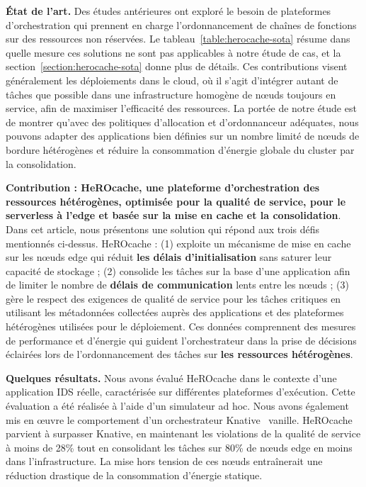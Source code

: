 \textbf{État de l'art.} Des études antérieures ont exploré le besoin de plateformes d'orchestration qui prennent en charge l'ordonnancement de chaînes de fonctions sur des ressources non réservées. Le tableau~\ref{table:herocache-sota} résume dans quelle mesure ces solutions ne sont pas applicables à notre étude de cas, et la section~\ref{section:herocache-sota} donne plus de détails. Ces contributions visent généralement les déploiements dans le cloud, où il s'agit d'intégrer autant de tâches que possible dans une infrastructure homogène de nœuds toujours en service, afin de maximiser l'efficacité des ressources. La portée de notre étude est de montrer qu'avec des politiques d'allocation et d'ordonnanceur adéquates, nous pouvons adapter des applications bien définies sur un nombre limité de nœuds de bordure hétérogènes et réduire la consommation d'énergie globale du cluster par la consolidation.

\textbf{Contribution : HeROcache, une plateforme d'orchestration des ressources hétérogènes, optimisée pour la qualité de service, pour le serverless à l'edge et basée sur la mise en cache et la consolidation}. Dans cet article, nous présentons une solution qui répond aux trois défis mentionnés ci-dessus. HeROcache : (1) exploite un mécanisme de mise en cache sur les nœuds edge qui réduit \textbf{les délais d'initialisation} sans saturer leur capacité de stockage ; (2) consolide les tâches sur la base d'une application afin de limiter le nombre de \textbf{délais de communication} lents entre les nœuds ; (3) gère le respect des exigences de qualité de service pour les tâches critiques en utilisant les métadonnées collectées auprès des applications et des plateformes hétérogènes utilisées pour le déploiement. Ces données comprennent des mesures de performance et d'énergie qui guident l'orchestrateur dans la prise de décisions éclairées lors de l'ordonnancement des tâches sur \textbf{les ressources hétérogènes}.

\textbf{Quelques résultats.} Nous avons évalué HeROcache dans le contexte d'une application IDS réelle, caractérisée sur différentes plateformes d'exécution. Cette évaluation a été réalisée à l'aide d'un simulateur ad hoc. Nous avons également mis en œuvre le comportement d'un orchestrateur Knative~\cite{knative} vanille. HeROcache parvient à surpasser Knative, en maintenant les violations de la qualité de service à moins de 28\% tout en consolidant les tâches sur 80\% de nœuds edge en moins dans l'infrastructure. La mise hors tension de ces nœuds entraînerait une réduction drastique de la consommation d'énergie statique.

